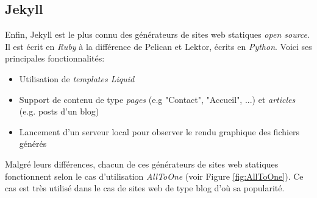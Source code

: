	\subsection*{Jekyll}
	Enfin, Jekyll \cite{Jekyll} est le plus connu des générateurs de sites web statiques \textit{open source}. Il est écrit en \textit{Ruby} à la différence de Pelican et Lektor, écrits en \textit{Python}. Voici ses principales fonctionnalités:
	
	\begin{itemize}
		\item Utilisation de \textit{templates Liquid}
		\item Support de contenu de type \textit{pages} (e.g "Contact", "Accueil", ...) et \textit{articles} (e.g. posts d'un blog)
		\item Lancement d'un serveur local pour observer le rendu graphique des fichiers générés\\
	\end{itemize}
	
	Malgré leurs différences, chacun de ces générateurs de sites web statiques fonctionnent selon le cas d'utilisation \textit{AllToOne} (voir Figure \ref{fig:AllToOne}). Ce cas est très utilisé dans le cas de sites web de type blog d'où sa popularité.